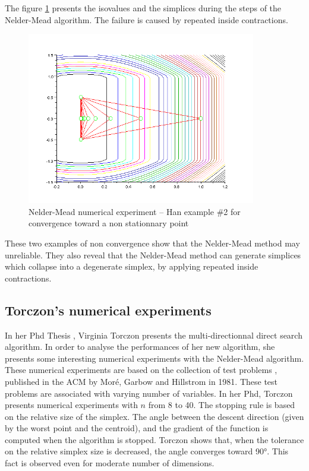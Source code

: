 The figure \ref{fig-nm-numexp-han2} presents the isovalues and the 
simplices during the steps of the Nelder-Mead algorithm.
The failure is caused by repeated inside contractions.

\begin{figure}
\begin{center}
\includegraphics[width=10cm]{han2-history-simplex.png}
\end{center}
\caption{Nelder-Mead numerical experiment -- Han example \#2 for convergence toward
a non stationnary point}
\label{fig-nm-numexp-han2}
\end{figure}

These two examples of non convergence show that the Nelder-Mead method may unreliable.
They also reveal that the Nelder-Mead method can generate simplices which collapse 
into a degenerate simplex, by applying repeated inside contractions.

\subsection{Torczon's numerical experiments}

In her Phd Thesis \cite{Torczon89multi-directionalsearch}, Virginia Torczon 
presents the multi-directionnal direct search algorithm. In order to analyse the 
performances of her new algorithm, she presents some interesting numerical 
experiments with the Nelder-Mead algorithm. 
These numerical experiments are based on the collection of test problems \cite{355943},
published in the ACM by Moré, Garbow and Hillstrom in 1981. 
These test problems are associated with varying number of variables.
In her Phd, Torczon presents numerical experiments with $n$ from 8 
to 40.
The stopping rule is based on the relative size of the simplex. 
The angle between the descent direction (given by the worst point and the centroid), and the
gradient of the function is computed when the algorithm is stopped.
Torczon shows that, when the tolerance on the relative simplex size is decreased, the 
angle converges toward 90°. This fact is observed even for moderate 
number of dimensions.

